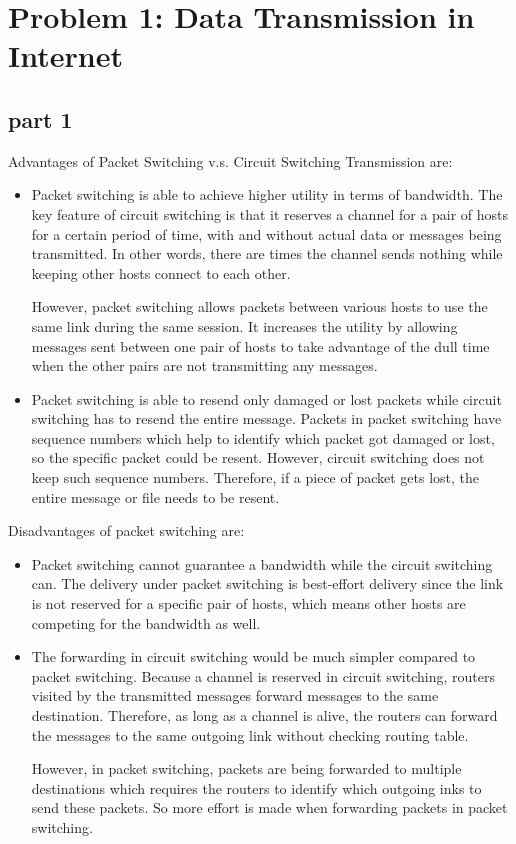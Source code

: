 \section{Problem 1: Data Transmission in Internet}

\subsection{part 1}
Advantages of Packet Switching v.s. Circuit Switching Transmission are:

\begin{itemize}
\item Packet switching is able to achieve higher utility in terms of bandwidth. The key feature of circuit switching is that it reserves a channel for a pair of hosts for a certain period of time, with and without actual data or messages being transmitted. In other words, there are times the channel sends nothing while keeping other hosts connect to each other.

However, packet switching allows packets between various hosts to use the same link during the same session. It increases the utility by allowing messages sent between one pair of hosts to take advantage of the dull time when the other pairs are not transmitting any messages.

\item Packet switching is able to resend only damaged or lost packets while circuit switching has to resend the entire message. Packets in packet switching have sequence numbers which help to identify which packet got damaged or lost, so the specific packet could be resent. However, circuit switching does not keep such sequence numbers. Therefore, if a piece of packet gets lost, the entire message or file needs to be resent.
\end{itemize}

Disadvantages of packet switching are:

\begin{itemize}
\item Packet switching cannot guarantee a bandwidth while the circuit switching can. The delivery under packet switching is best-effort delivery since the link is not reserved for a specific pair of hosts, which means other hosts are competing for the bandwidth as well.

\item The forwarding in circuit switching would be much simpler compared to packet switching. Because a channel is reserved in circuit switching, routers visited by the transmitted messages forward messages to the same destination. Therefore, as long as a channel is alive, the routers can forward the messages to the same outgoing link without checking routing table.

However, in packet switching, packets are being forwarded to multiple destinations which requires the routers to identify which outgoing inks to send these packets. So more effort is made when forwarding packets in packet switching.
\end{itemize}

